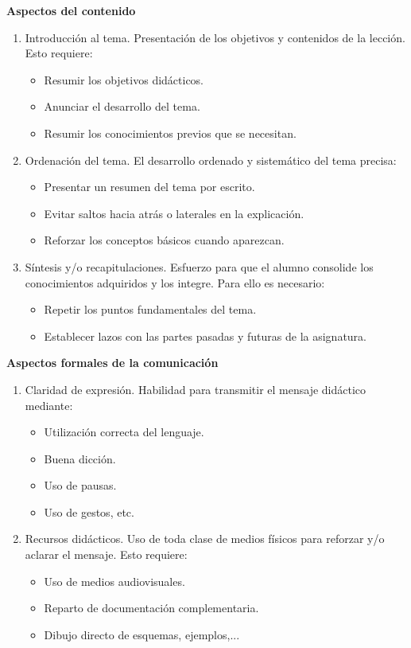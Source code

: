 \textbf{Aspectos del contenido}
\begin{enumerate}
\item Introducción al tema. Presentación de los objetivos y contenidos de la lección. Esto requiere:
\begin{itemize}
\item Resumir los objetivos didácticos.
\item Anunciar el desarrollo del tema.
\item Resumir los conocimientos previos que se necesitan.
\end{itemize}
\item Ordenación del tema. El desarrollo ordenado y sistemático del tema precisa:
\begin{itemize}
\item Presentar un resumen del tema por escrito.
\item Evitar saltos hacia atrás o laterales en la explicación.
\item Reforzar los conceptos básicos cuando aparezcan.
\end{itemize}
\item Síntesis y/o recapitulaciones. Esfuerzo para que el alumno consolide los conocimientos adquiridos y los integre. Para ello es necesario:
\begin{itemize}
\item Repetir los puntos fundamentales del tema.
\item Establecer lazos con las partes pasadas y futuras de la asignatura.
\end{itemize}
\end{enumerate}

\textbf{Aspectos formales de la comunicación}
\begin{enumerate}
\item Claridad de expresión. Habilidad para transmitir el mensaje didáctico mediante:
\begin{itemize}
\item Utilización correcta del lenguaje.
\item Buena dicción.
\item Uso de pausas.
\item Uso de gestos, etc.
\end{itemize}
\item Recursos didácticos. Uso de toda clase de medios físicos para reforzar y/o aclarar el mensaje. Esto requiere:
\begin{itemize}
\item Uso de medios audiovisuales.
\item Reparto de documentación complementaria.
\item Dibujo directo de esquemas, ejemplos,...
\end{itemize}
\end{enumerate}

